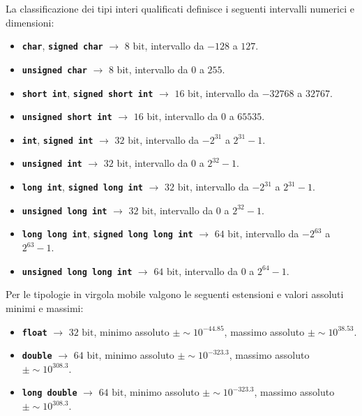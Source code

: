 La classificazione dei tipi interi qualificati definisce i seguenti intervalli numerici e dimensioni:
\begin{itemize}
    \item \textbf{\texttt{char}}, \textbf{\texttt{signed char}} $\rightarrow$ $8\text{ bit}$, intervallo da $-128$ a $127$.
    \item \textbf{\texttt{unsigned char}} $\rightarrow$ $8\text{ bit}$, intervallo da $0$ a $255$.
    \item \textbf{\texttt{short int}}, \textbf{\texttt{signed short int}} $\rightarrow$ $16\text{ bit}$, intervallo da $-32768$ a $32767$.
    \item \textbf{\texttt{unsigned short int}} $\rightarrow$ $16\text{ bit}$, intervallo da $0$ a $65535$.
    \item \textbf{\texttt{int}}, \textbf{\texttt{signed int}} $\rightarrow$ $32\text{ bit}$, intervallo da $-2^{31}$ a $2^{31}-1$.
    \item \textbf{\texttt{unsigned int}} $\rightarrow$ $32\text{ bit}$, intervallo da $0$ a $2^{32}-1$.
    \item \textbf{\texttt{long int}}, \textbf{\texttt{signed long int}} $\rightarrow$ $32\text{ bit}$, intervallo da $-2^{31}$ a $2^{31}-1$.
    \item \textbf{\texttt{unsigned long int}} $\rightarrow$ $32\text{ bit}$, intervallo da $0$ a $2^{32}-1$.
    \item \textbf{\texttt{long long int}}, \textbf{\texttt{signed long long int}} $\rightarrow$ $64\text{ bit}$, intervallo da $-2^{63}$ a $2^{63}-1$.
    \item \textbf{\texttt{unsigned long long int}} $\rightarrow$ $64\text{ bit}$, intervallo da $0$ a $2^{64}-1$.
\end{itemize}

Per le tipologie in virgola mobile valgono le seguenti estensioni e valori assoluti minimi e massimi:
\begin{itemize}
    \item \textbf{\texttt{float}} $\rightarrow$ $32\text{ bit}$, minimo assoluto $\pm\sim 10^{-44.85}$, massimo assoluto $\pm\sim 10^{38.53}$.
    \item \textbf{\texttt{double}} $\rightarrow$ $64\text{ bit}$, minimo assoluto $\pm\sim 10^{-323.3}$, massimo assoluto $\pm\sim 10^{308.3}$.
    \item \textbf{\texttt{long double}} $\rightarrow$ $64\text{ bit}$, minimo assoluto $\pm\sim 10^{-323.3}$, massimo assoluto $\pm\sim 10^{308.3}$.
\end{itemize}

